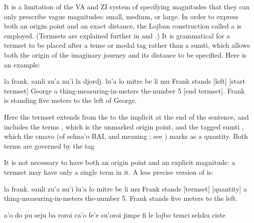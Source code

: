 It is a limitation of the VA and ZI system of specifying
    magnitudes that they can only prescribe vague magnitudes:
    small, medium, or large. In order to express both an origin
    point and an exact distance, the Lojban construction called a
     is employed. (Termsets are explained further in  and .) It is grammatical for a
    termset to be placed after a tense or modal tag rather than a
    sumti, which allows both the origin of the imaginary journey
    and its distance to be specified. Here is an example:
\begin{example}
la frank. sanli zu'a nu'i la djordj.\n
\T	lu'a lo mitre\n
\T	be li mu \n
Frank stands [left] [start termset] George\n
\T	[quantity] a thing-measuring-in-meters\n
\T	the-number 5 [end termset].\n
Frank is standing five meters to the left of George.
\end{example}

Here the termset extends from the  to the implicit
     at the end of the sentence, and includes the terms
    , which is the unmarked origin point, and the
    tagged sumti , which the cmavo 
    (of selma'o BAI, and meaning ; see ) marks as a quantity. Both
    terms are governed by the tag 

It is not necessary to have both an origin point and an
    explicit magnitude: a termset may have only a single term in
    it. A less precise version of 
    is:
\begin{example}
la frank. sanli zu'a nu'i lu'a\n
\T	lo mitre be li mu\n
Frank stands  [termset] [quantity]\n
\T	a thing-measuring-in-meters the-number 5.\n
Frank stands five meters to the left.
\end{example}



\begin{example}
a'o do pu seju ba roroi ca'o fe'e su'oroi jimpe\n
\T	fi le lojbo temci selsku ciste
\end{example}



